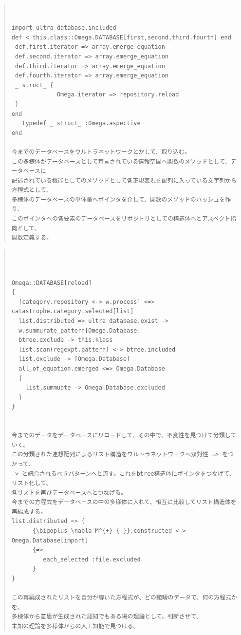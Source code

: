 \documentclass{jsarticle}
\begin{document}
\begin{quote}
\setlength{\baselineskip}{12pt}
\begin{verbatim}


import ultra_database.included
def < this.class::Omega.DATABASE[first,second,third.fourth] end
 def.first.iterator => array.emerge_equation
 def.second.iterator => array.emerge_equation
 def.third.iterator => array.emerge_equation
 def.fourth.iterator => array.emerge_equation
 _ struct_ {
             Omega.iterator => repository.reload
 } 
end
   typedef _ struct_ :Omega.aspective
end

今までのデータベースをウルトラネットワークとかして、取り込む。
この多様体がデータベースとして宣言されている情報空間へ関数のメソッドとして、データベースに
記述されている機能としてのメソッドとして各正規表現を配列に入っている文字列から方程式として、
多様体のデータベースの単体量へポインタを介して、関数のメソッドのハッシュを作り、
このポインタへの各要素のデータベースをリポジトリとしての構造体へとアスペクト指向として、
関数定義する。

\end{verbatim}
\end{quote}
      
    
\begin{quote}
\setlength{\baselineskip}{12pt}
\begin{verbatim}



Omega::DATABASE[reload]
{ 
  [category.repository <-> w.process] <=> catastrophe.category.selected[list]
  list.distributed => ultra_database.exist -> 
  w.summurate_pattern[Omega.Database]
  btree.exclude -> this.klass
  list.scan(regexpt.pattern) <-> btree.included
  list.exclude -> [Omega.Database]
  all_of_equation.emerged <=> Omega.Database
  {
    list.summuate -> Omega.Database.excluded
  }
}
   

今までのデータをデータベースにリロードして、その中で、不変性を見つけて分類していく。
この分類された連想配列によるリスト構造をウルトラネットワークへ双対性 => をつかって、
-> と統合されるべきパターンへと流す。これをbtree構造体にポインタをつなげて、リスト化して、
各リストを再びデータベースへとつなげる。
今までの方程式をデータベースの中の多様体に入れて、相互に比較してリスト構造体を再編成する。
list.distributed => {
      {\bigoplus \nabla M^{+}_{-}}.constructed <-> Omega.Database[import]                 
      {=>
         each_selected :file.excluded
      }
}
                      
この再編成されたリストを自分が導いた方程式が、どの範疇のデータで、何の方程式かを、
多様体から意思が生成された認知でもある場の理論として、判断させて、
未知の理論を多様体からの人工知能で見つける。

\end{verbatim}
\end{quote}
\end{document}
